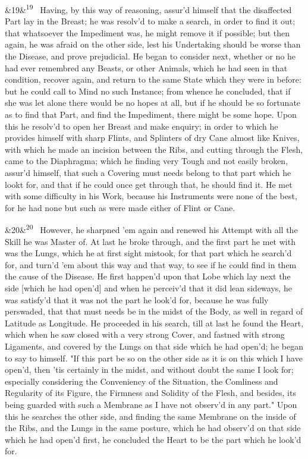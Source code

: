 \documentclass[12pt]{article}
\newcommand{\para}[1][]{\par\noindent\ifx&#1&\else\textsuperscript{\footnotesize #1}~\fi}
\begin{document}
\para[19] Having, by this way of reasoning, assur'd himself that the disaffected Part lay in the Breast; he was resolv'd to make a search, in order to find it out; that whatsoever the Impediment was, he might remove it if possible; but then again, he was afraid on the other side, lest his Undertaking should be worse than the Disease, and prove prejudicial. He began to consider next, whether or no he had ever remembred any Beasts, or other Animals, which he had seen in that condition, recover again, and return to the same State which they were in before: but he could call to Mind no such Instance; from whence he concluded, that if she was let alone there would be no hopes at all, but if he should be so fortunate as to find that Part, and find the Impediment, there might be some hope. Upon this he resolv'd to open her Breast and make enquiry; in order to which he provides himself with sharp Flints, and Splinters of dry Cane almost like Knives, with which he made an incision between the Ribs, and cutting through the Flesh, came to the Diaphragma; which he finding very Tough and not easily broken, assur'd himself, that such a Covering must needs belong to that part which he lookt for, and that if he could once get through that, he should find it. He met with some difficulty in his Work, because his Instruments were none of the best, for he had none but such as were made either of Flint or Cane.

\para[20] However, he sharpned 'em again and renewed his Attempt with all the Skill he was Master of. At last he broke through, and the first part he met with was the Lungs, which he at first sight mistook, for that part which he search'd for, and turn'd 'em about this way and that way, to see if he could find in them the cause of the Disease. He first happen'd upon that Lobe which lay next the side [which he had open'd] and when he perceiv'd that it did lean sideways, he was satisfy'd that it was not the part he look'd for, because he was fully perswaded, that that must needs be in the midst of the Body, as well in regard of Latitude as Longitude. He proceeded in his search, till at last he found the Heart, which when he saw closed with a very strong Cover, and fastned with strong Ligaments, and covered by the Lungs on that side which he had open'd; he began to say to himself. "If this part be so on the other side as it is on this which I have open'd, then 'tis certainly in the midst, and without doubt the same I look for; especially considering the Conveniency of the Situation, the Comliness and Regularity of its Figure, the Firmness and Solidity of the Flesh, and besides, its being guarded with such a Membrane as I have not observ'd in any part." Upon this he searches the other side, and finding the same Membrane on the inside of the Ribs, and the Lungs in the same posture, which he had observ'd on that side which he had open'd first, he concluded the Heart to be the part which he look'd for.
\end{document}
